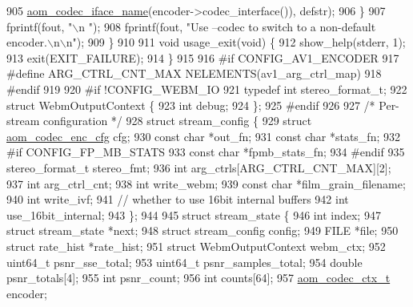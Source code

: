 \begin{DoxyCodeInclude}
{{{{{{{{{905             \hyperlink{group__codec_ga013b1f6d96b2cf9489396311a7e5179b}{aom\_codec\_iface\_name}(encoder->codec\_interface()), defstr);
906   \}
907   fprintf(fout, \textcolor{stringliteral}{"\(\backslash\)n        "});
908   fprintf(fout, \textcolor{stringliteral}{"Use --codec to switch to a non-default encoder.\(\backslash\)n\(\backslash\)n"});
909 \}
910 
911 \textcolor{keywordtype}{void} usage\_exit(\textcolor{keywordtype}{void}) \{
912   show\_help(stderr, 1);
913   exit(EXIT\_FAILURE);
914 \}
915 
916 \textcolor{preprocessor}{#if CONFIG\_AV1\_ENCODER}
917 \textcolor{preprocessor}{#define ARG\_CTRL\_CNT\_MAX NELEMENTS(av1\_arg\_ctrl\_map)}
918 \textcolor{preprocessor}{#endif}
919 
920 \textcolor{preprocessor}{#if !CONFIG\_WEBM\_IO}
921 \textcolor{keyword}{typedef} \textcolor{keywordtype}{int} stereo\_format\_t;
922 \textcolor{keyword}{struct }WebmOutputContext \{
923   \textcolor{keywordtype}{int} debug;
924 \};
925 \textcolor{preprocessor}{#endif}
926 
927 \textcolor{comment}{/* Per-stream configuration */}
928 \textcolor{keyword}{struct }stream\_config \{
929   \textcolor{keyword}{struct }\hyperlink{structaom__codec__enc__cfg}{aom\_codec\_enc\_cfg} cfg;
930   \textcolor{keyword}{const} \textcolor{keywordtype}{char} *out\_fn;
931   \textcolor{keyword}{const} \textcolor{keywordtype}{char} *stats\_fn;
932 \textcolor{preprocessor}{#if CONFIG\_FP\_MB\_STATS}
933   \textcolor{keyword}{const} \textcolor{keywordtype}{char} *fpmb\_stats\_fn;
934 \textcolor{preprocessor}{#endif}
935   stereo\_format\_t stereo\_fmt;
936   \textcolor{keywordtype}{int} arg\_ctrls[ARG\_CTRL\_CNT\_MAX][2];
937   \textcolor{keywordtype}{int} arg\_ctrl\_cnt;
938   \textcolor{keywordtype}{int} write\_webm;
939   \textcolor{keyword}{const} \textcolor{keywordtype}{char} *film\_grain\_filename;
940   \textcolor{keywordtype}{int} write\_ivf;
941   \textcolor{comment}{// whether to use 16bit internal buffers}
942   \textcolor{keywordtype}{int} use\_16bit\_internal;
943 \};
944 
945 \textcolor{keyword}{struct }stream\_state \{
946   \textcolor{keywordtype}{int} index;
947   \textcolor{keyword}{struct }stream\_state *next;
948   \textcolor{keyword}{struct }stream\_config config;
949   FILE *file;
950   \textcolor{keyword}{struct }rate\_hist *rate\_hist;
951   \textcolor{keyword}{struct }WebmOutputContext webm\_ctx;
952   uint64\_t psnr\_sse\_total;
953   uint64\_t psnr\_samples\_total;
954   \textcolor{keywordtype}{double} psnr\_totals[4];
955   \textcolor{keywordtype}{int} psnr\_count;
956   \textcolor{keywordtype}{int} counts[64];
957   \hyperlink{structaom__codec__ctx}{aom\_codec\_ctx\_t} encoder;
}}}}}}}}}
\end{DoxyCodeInclude}
